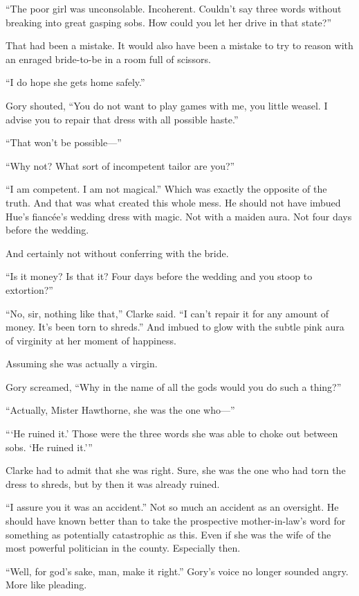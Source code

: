 “The poor girl was unconsolable. Incoherent. Couldn’t say three words
without breaking into great gasping sobs. How could you let her drive in
that state?”

That had been a mistake. It would also have been a mistake to try to
reason with an enraged bride-to-be in a room full of scissors.

“I do hope she gets home safely.”

Gory shouted, “You do not want to play games with me, you little weasel.
I advise you to repair that dress with all possible haste.”

“That won’t be possible—”

“Why not? What sort of incompetent tailor are you?”

“I am competent. I am not magical.” Which was exactly the opposite of
the truth. And that was what created this whole mess. He should not have
imbued Hue’s fiancée’s wedding dress with magic. Not with a maiden aura.
Not four days before the wedding.

And certainly not without conferring with the bride.

“Is it money? Is that it? Four days before the wedding and you stoop to
extortion?”

“No, sir, nothing like that,” Clarke said. “I can’t repair it for any
amount of money. It’s been torn to shreds.” And imbued to glow with the
subtle pink aura of virginity at her moment of happiness.

Assuming she was actually a virgin.

Gory screamed, “Why in the name of all the gods would you do such a
thing?”

“Actually, Mister Hawthorne, she was the one who—”

“‘He ruined it.’ Those were the three words she was able to choke out
between sobs. ‘He ruined it.’”

Clarke had to admit that she was right. Sure, she was the one who had
torn the dress to shreds, but by then it was already ruined.

“I assure you it was an accident.” Not so much an accident as an
oversight. He should have known better than to take the prospective
mother-in-law’s word for something as potentially catastrophic as this.
Even if she was the wife of the most powerful politician in the county.
Especially then.

“Well, for god’s sake, man, make it right.” Gory’s voice no longer
sounded angry. More like pleading.

